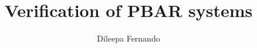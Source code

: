 \documentclass[]{report}
\title{Verification of PBAR systems}
\author{Dileepa Fernando}
\begin{document}
\maketitle

\begin{abstract}
\end{abstract}

\end{document}
